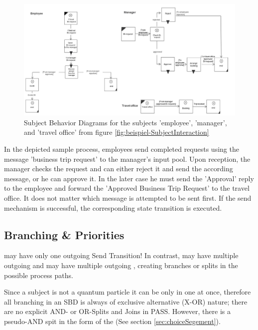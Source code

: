 \begin{landscape}
	\begin{figure}[htbp]
		\centering
		\includegraphics[width=0.9\linewidth]{Figures/Ontology/SubjectBehavior/Vollst-Beispiel}
		\caption[Subject Behavior Diagrams for the subjects 'employee', 'manager', and 'travel office' from figure \ref{fig:beispiel-SubjectInteraction}]{Subject Behavior Diagrams for the subjects 'employee', 'manager', and 'travel office' from figure \ref{fig:beispiel-SubjectInteraction}}
		\label{fig:vollst-beispiel}
	\end{figure}
\end{landscape}

In the depicted sample process, employees send completed requests using the message 'business trip request' to the manager's input pool. Upon reception, the manager checks the request and can either reject it and send the according message, or he can approve it. In the later case he must send the 'Approval' reply to the employee and forward the 'Approved Business Trip Request' to the travel office. It does not matter which message is attempted to be sent first. If the send mechanism is successful, the corresponding state transition is executed. 


\subsection{Branching \& Priorities}

 may have only one outgoing Send Transition! In contrast,  may have multiple outgoing  and  may have multiple outgoing , creating branches or splits in the possible process paths. 

Since a subject is not a quantum particle it can be only in one  at once, therefore all branching in an SBD is always of exclusive alternative (X-OR) nature; there are no explicit AND- or OR-Splits and Joins in PASS.  However, there is a pseudo-AND spit in the form of the  (See section \ref{sec:choiceSegement}).

